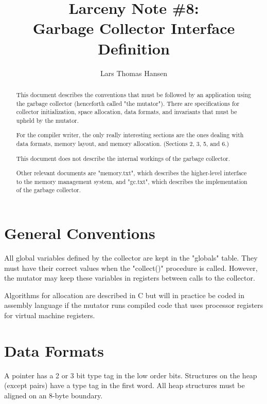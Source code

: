 

\title{Larceny Note \#8: \\
       Garbage Collector Interface Definition}
\author{Lars Thomas Hansen}


\maketitle

\begin{abstract}
This document describes the conventions that must be followed by an
application using the garbage collector (henceforth called "the
mutator").  There are specifications for collector initialization,
space allocation, data formats, and invariants that must be upheld by
the mutator.

For the compiler writer, the only really interesting sections are the
ones dealing with data formats, memory layout, and memory allocation.
(Sections 2, 3, 5, and 6.)

This document does not describe the internal workings of the garbage 
collector.

Other relevant documents are "memory.txt", which describes the
higher-level interface to the memory management system, and "gc.txt",
which describes the implementation of the garbage collector.
\end{abstract}


\section{General Conventions}

All global variables defined by the collector are kept in the "globals"
table. They must have their correct values when the "collect()" procedure
is called.  However, the mutator may keep these variables in registers
between calls to the collector.

Algorithms for allocation are described in C but will in practice be coded
in assembly language if the mutator runs compiled code that uses processor
registers for virtual machine registers.


\section{Data Formats}

A pointer has a 2 or 3 bit type tag in the low order bits. Structures on
the heap (except pairs) have a type tag in the first word. All heap
structures must be aligned on an 8-byte boundary.

